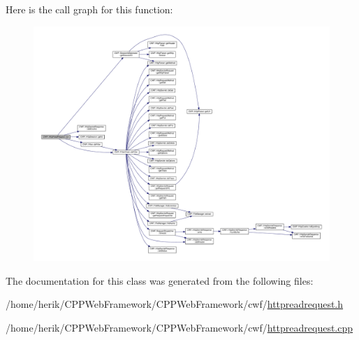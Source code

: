 Here is the call graph for this function\+:
\nopagebreak
\begin{figure}[H]
\begin{center}
\leavevmode
\includegraphics[width=350pt]{class_c_w_f_1_1_http_read_request_a45c1183b9857a34d4a53452917f7bcec_cgraph}
\end{center}
\end{figure}




The documentation for this class was generated from the following files\+:\begin{DoxyCompactItemize}
\item 
/home/herik/\+C\+P\+P\+Web\+Framework/\+C\+P\+P\+Web\+Framework/cwf/\hyperlink{httpreadrequest_8h}{httpreadrequest.\+h}\item 
/home/herik/\+C\+P\+P\+Web\+Framework/\+C\+P\+P\+Web\+Framework/cwf/\hyperlink{httpreadrequest_8cpp}{httpreadrequest.\+cpp}\end{DoxyCompactItemize}
